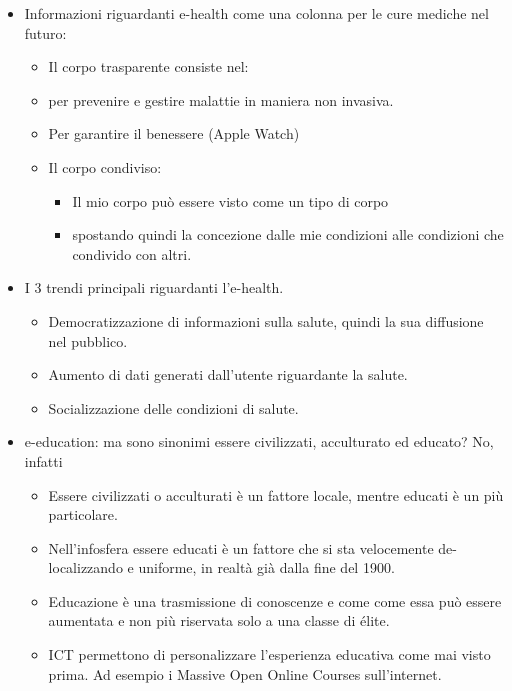 \documentclass[11pt, a4page, twocolumn]{article}
\begin{document}
\begin{itemize}
\item Informazioni riguardanti e-health come una colonna per le cure mediche nel futuro:
  \begin{itemize}
    \item Il corpo trasparente consiste nel:
    \item per prevenire e gestire malattie in maniera non invasiva.
    \item Per garantire il benessere (Apple Watch)
    \item Il corpo condiviso:
      \begin{itemize}
        \item Il mio corpo può essere visto come un tipo di corpo
        \item spostando quindi la concezione dalle mie condizioni alle condizioni che condivido con altri.
      \end{itemize}
  \end{itemize}
\item I 3 trendi principali riguardanti l’e-health.
  \begin{itemize}
    \item Democratizzazione di informazioni sulla salute, quindi la sua diffusione nel pubblico.
    \item Aumento di dati generati dall’utente riguardante la salute.
    \item Socializzazione delle condizioni di salute.
  \end{itemize}
\item e-education: ma sono sinonimi essere civilizzati, acculturato ed educato? No, infatti
  \begin{itemize}
    \item Essere civilizzati o acculturati è un fattore locale, mentre educati è un più particolare.
    \item Nell’infosfera essere educati è un fattore che si sta velocemente de-localizzando e uniforme, in realtà già dalla fine del 1900.
    \item Educazione è una trasmissione di conoscenze e come come essa può essere aumentata e non più riservata solo a una classe di élite.
    \item ICT permettono di personalizzare l’esperienza educativa come mai visto prima. Ad esempio i Massive Open Online Courses sull’internet.
  \end{itemize}
\end{itemize}
\end{document}
